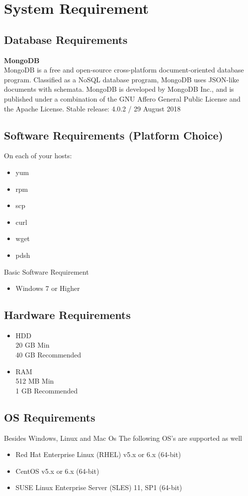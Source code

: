 \documentclass[oneside,a4paper,12pt]{book}
\begin{document}
\section{System Requirement}
\subsection{Database Requirements}
\textbf{MongoDB}\\
MongoDB is a free and open-source cross-platform document-oriented database program. Classified as a NoSQL database program, MongoDB uses JSON-like documents with schemata. MongoDB is developed by MongoDB Inc., and is published under a combination of the GNU Affero General Public License and the Apache License.
Stable release: 4.0.2 / 29 August 2018
\subsection{Software Requirements (Platform Choice)}
\par On each of your hosts:
\begin{itemize}
\item yum
\item rpm
\item scp
\item curl
\item wget
\item pdsh
\end{itemize}
Basic Software Requirement
\begin{itemize}
    \item Windows 7 or Higher
\end{itemize}
\subsection{Hardware Requirements}
\begin{itemize}
    \item HDD\\
    20 GB Min\\
    40 GB Recommended
    \item RAM\\
    512 MB Min\\
    1 GB Recommended
\end{itemize}
\subsection{OS Requirements}
Besides Windows, Linux and Mac Os
The following OS's are supported as well
\begin{itemize}
    \item Red Hat Enterprise Linux (RHEL) v5.x or 6.x (64-bit)
    \item CentOS v5.x or 6.x (64-bit)
	\item SUSE Linux Enterprise Server (SLES) 11, SP1 (64-bit)
\end{itemize}
\end{document}

